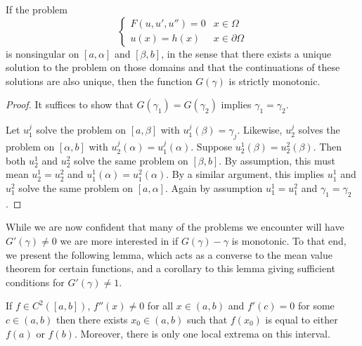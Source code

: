 \documentclass{article}
\begin{document}
\begin{thm} \label{thm:mono}
If the problem
\begin{equation*}
\begin{cases} F(u,u',u'') = 0 & x \in \Omega \\ u(x) = h(x) & x \in \partial \Omega \end{cases}
\end{equation*}
is nonsingular on $[a,\alpha]$ and $[\beta,b]$, in the sense that there exists a unique solution to the problem on those domains and that the continuations of these solutions are also unique, then the function $G(\gamma)$ is strictly monotonic.
\end{thm}

\begin{proof}
It suffices to show that $G(\gamma_1) = G(\gamma_2)$ implies $\gamma_1 = \gamma_2$.

Let $u^j_1$ solve the problem on $[a,\beta]$ with $u^j_1(\beta) = \gamma_j$.
Likewise, $u^j_2$ solves the problem on $[\alpha, b]$ with $u^j_2(\alpha) = u^j_1(\alpha)$.
Suppose $u^1_2(\beta) = u^2_2(\beta)$.
Then both $u^1_2$ and $u^2_2$ solve the same problem on $[\beta,b]$.
By assumption, this must mean $u^1_2 = u^2_2$ and $u^1_1(\alpha) = u^2_1(\alpha)$.
By a similar argument, this implies $u^1_1$ and $u^2_1$ solve the same problem on $[a,\alpha]$.
Again by assumption $u^1_1 = u^2_1$ and $\gamma_1 = \gamma_2$.
\end{proof}

While we are now confident that many of the problems we encounter will have $G'(\gamma) \neq 0$ we are more interested in if $G(\gamma) - \gamma$ is monotonic.
To that end, we present the following lemma, which acts as a converse to the mean value theorem for certain functions, and a corollary to this lemma giving sufficient conditions for $G'(\gamma) \neq 1$.

\begin{lemma}
If $f \in C^2([a,b])$, $f''(x) \neq 0$ for all $x \in (a,b)$ and $f'(c) = 0$ for some $c \in (a,b)$ then there exists $x_0 \in (a,b)$ such that $f(x_0)$ is equal to either $f(a)$ or $f(b)$.
Moreover, there is only one local extrema on this interval.
\end{lemma}
\end{document}
